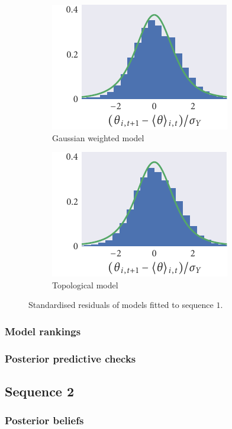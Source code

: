 \begin{figure}
\begin{subfigure}[b]{0.33333\textwidth}
  \end{subfigure}%
  \begin{subfigure}[b]{0.33333\textwidth}
    \includegraphics{seq1/gauss_residuals.pdf}
    \caption{Gaussian weighted model}
  \end{subfigure}%
  \begin{subfigure}[b]{0.33333\textwidth}
    \includegraphics{seq1/top_residuals.pdf}
    \caption{Topological model}
  \end{subfigure}
  \caption{Standardised residuals of models fitted to sequence $1$.}
\end{figure}

\subsubsection{Model rankings}

\subsubsection{Posterior predictive checks}

\subsection{Sequence 2}

\subsubsection{Posterior beliefs}

